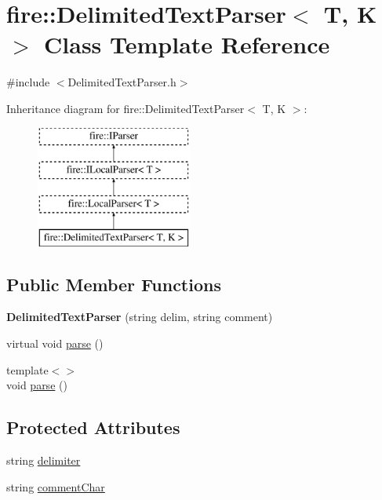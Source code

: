 \hypertarget{a00012}{}\section{fire\+:\+:Delimited\+Text\+Parser$<$ T, K $>$ Class Template Reference}
\label{a00012}


{\ttfamily \#include $<$Delimited\+Text\+Parser.\+h$>$}

Inheritance diagram for fire\+:\+:Delimited\+Text\+Parser$<$ T, K $>$\+:\begin{figure}[H]
\begin{center}
\leavevmode
\includegraphics[height=4.000000cm]{a00012}
\end{center}
\end{figure}
\subsection*{Public Member Functions}
\begin{DoxyCompactItemize}
\item 
\hypertarget{a00012_aa1f041ebbf0bf72145e8bd20bf95f3f4}{}{\bfseries Delimited\+Text\+Parser} (string delim, string comment)\label{a00012_aa1f041ebbf0bf72145e8bd20bf95f3f4}

\item 
virtual void \hyperlink{a00012_a686df5548771cae833d5e721442a821a}{parse} ()
\item 
{\footnotesize template$<$$>$ }\\void \hyperlink{a00012_a773fa7ed28cb9d8c384ad94bd81fc93f}{parse} ()
\end{DoxyCompactItemize}
\subsection*{Protected Attributes}
\begin{DoxyCompactItemize}
\item 
string \hyperlink{a00012_ac817fc333b53611a41f446977461bdbf}{delimiter}
\item 
string \hyperlink{a00012_acdd7b27b8109ed41e7d9bc5e6de72e93}{comment\+Char}
\end{DoxyCompactItemize}


